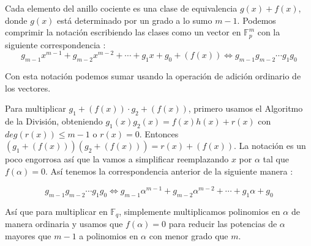  Cada elemento del anillo cociente es una clase de equivalencia $g(x)+f(x)$, donde $g(x)$ está determinado por un grado a lo sumo $m-1$. Podemos comprimir la notación escribiendo las clases como un vector en $\mathbb{F}_p^m$ con la siguiente correspondencia : 
 \[
 g_{m-1}x^{m-1} + g_{m-2}x^{m-2} + \cdots + g_1x + g_0 + (f(x)) \Leftrightarrow g_{m-1}g_{m-2}\cdots g_1g_0 
 \]
 
Con esta notación podemos sumar usando la operación de adición ordinario de los vectores.

Para multiplicar $g_1 + (f(x)) \cdot g_2 + (f(x))$, primero usamos el Algoritmo de la División, obteniendo $g_1(x)g_2(x) = f(x)h(x)+r(x)$ con $deg(r(x)) \leq m-1$ o $r(x) = 0$. Entonces $(g_1 + (f(x)))(g_2 + (f(x))) = r(x) + (f(x))$. La notación es un poco engorrosa así que la vamos a simplificar reemplazando $x$ por $\alpha$ tal que $f(\alpha) = 0$. Así tenemos la correspondencia anterior de la siguiente manera :

\[
g_{m-1}g_{m-2}\cdots g_1g_0  \Leftrightarrow g_{m-1}\alpha^{m-1} + g_{m-2}\alpha^{m-2} + \cdots + g_1\alpha + g_0 
 \]

Así que para multiplicar en $\mathbb{F}_q$, simplemente multiplicamos polinomios en $\alpha$ de manera ordinaria y usamos que $f(\alpha) = 0$ para reducir las potencias de $\alpha$ mayores que $m-1$ a polinomios en $\alpha$ con menor grado que $m$.

